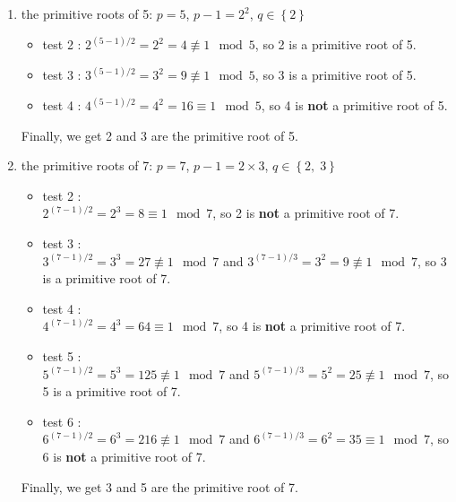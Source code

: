 \documentclass[11pt]{article}
\renewcommand\part[1]{\vspace{.10in}\textbf{#1}}
\newcommand\correctness{\vspace{.10in}\textbf{Correctness: }}
\newcommand\runtime{\vspace{.10in}\textbf{Running time: }}
\begin{document}
\begin{enumerate}
	\item the primitive roots of 5: 
		$p = 5$, $p-1 = 2^2$, $q \in \left \{ 2 \right \}$
		\begin{itemize}
			\item test 2 : $2^{(5-1)/2} = 2^2 = 4 \not\equiv 1 \mod 5$, so 2 is a primitive root of 5.
			\item test 3 : $3^{(5-1)/2} = 3^2 = 9 \not\equiv 1 \mod 5$, so 3 is a primitive root of 5.
			\item test 4 : $4^{(5-1)/2} = 4^2 = 16 \equiv 1 \mod 5$, so 4 is \textbf{not} a primitive root of 5.
		\end{itemize}
		
		Finally, we get 2 and 3 are the primitive root of 5.
	\item the primitive roots of 7:
		$p = 7$, $p-1 = 2 \times 3$, $q \in \left \{ 2, \; 3 \right \}$
		\begin{itemize}
			\item test 2 : \\
			$2^{(7-1)/2} = 2^3 = 8 \equiv 1 \mod 7$, so 2 is \textbf{not} a primitive root of 7.
			\item test 3 : \\
			$3^{(7-1)/2} = 3^3 = 27 \not\equiv 1 \mod 7$ and $3^{(7-1)/3} = 3^2 = 9 \not\equiv 1 \mod 7$, so 3 is a primitive root of 7.
			\item test 4 : \\
			$4^{(7-1)/2} = 4^3 = 64 \equiv 1 \mod 7$, so 4 is \textbf{not} a primitive root of 7.
			\item test 5 : \\
			$5^{(7-1)/2} = 5^3 = 125 \not\equiv 1 \mod 7$ and $5^{(7-1)/3} = 5^2 = 25 \not\equiv 1 \mod 7$, so 5 is a primitive root of 7.
			\item test 6 : \\
			$6^{(7-1)/2} = 6^3 = 216 \not\equiv 1 \mod 7$ and $6^{(7-1)/3} = 6^2 = 35 \equiv 1 \mod 7$, so 6 is \textbf{not} a primitive root of 7.
		\end{itemize}
		Finally, we get 3 and 5 are the primitive root of 7.
\end{enumerate}




\end{document}

